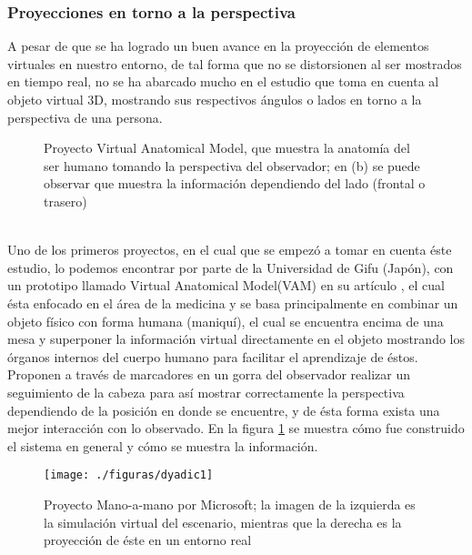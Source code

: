 \documentclass[a4paper,openright,12pt]{report}
\begin{document}
\subsubsection{Proyecciones en torno a la perspectiva}
A pesar de que se ha logrado un buen avance en la proyección de elementos virtuales en nuestro entorno, de tal forma que no se distorsionen al ser mostrados en tiempo real, no se ha abarcado mucho en el estudio que toma en cuenta al objeto virtual 3D, mostrando sus respectivos ángulos o lados en torno a la perspectiva de una persona.
\begin{figure}[thb]
	\centering
	\caption[Proyecto Virtual Anatomical Model]{Proyecto Virtual Anatomical Model, que muestra la anatomía del ser humano tomando la perspectiva del observador; en (b) se puede observar que muestra la información dependiendo del lado (frontal o trasero) \cite{kondo2008}} \label{fig:vam}
\end{figure}\\
Uno de los primeros proyectos, en el cual que se empezó a tomar en cuenta éste estudio, lo podemos encontrar por parte de la Universidad de Gifu (Japón), con un prototipo llamado Virtual Anatomical Model(VAM) en su artículo \cite{kondo2008}, el cual ésta enfocado en el área de la medicina y se basa principalmente en combinar un objeto físico con forma humana (maniquí), el cual se encuentra encima de una mesa y superponer la información virtual directamente en el objeto mostrando los órganos internos del cuerpo humano para facilitar el aprendizaje de éstos. Proponen a través de marcadores en un gorra del observador realizar un seguimiento de la cabeza para así mostrar correctamente la perspectiva dependiendo de la posición en donde se encuentre, y de ésta forma exista una mejor interacción con lo observado. En la figura \ref{fig:vam} se muestra cómo fue construido el sistema en general y cómo se muestra la información.
\begin{figure}[htb]
	\centering
	\texttt{[image: ./figuras/dyadic1]}
	\caption[Proyecto Mano-a-mano por Microsoft\textregistered]{Proyecto Mano-a-mano por Microsoft\textregistered; la imagen de la izquierda es la simulación virtual del escenario, mientras que la derecha es la proyección de éste en un entorno real} \label{fig:perspectiva}
\end{figure}\\
\end{document}
